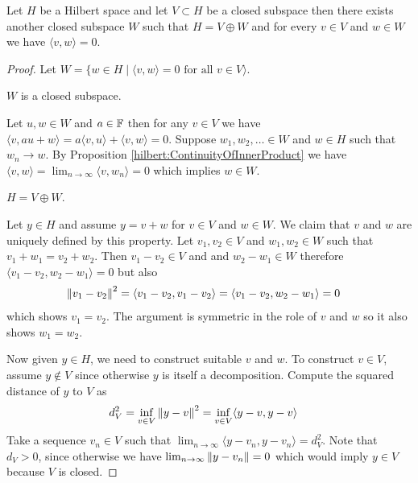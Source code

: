 \begin{prop}Let $H$ be a Hilbert space and let $V \subset H$ be a closed subspace then there exists another closed subspace $W$ such that $H = V \oplus W$ and for every $v \in V$ and $w \in W$ we have $\langle v, w \rangle = 0$.  
\end{prop}
\begin{proof}
Let $W = \lbrace w \in H \mid \langle v, w \rangle = 0 \text{ for all $v \in V$}  \rangle$.  

\begin{clm} $W$ is a closed subspace.  
\end{clm}
Let $u,w \in W$ and $a \in \mathbb{F}$ then for any $v \in V$ we have $\langle v, au + w \rangle = a \langle v, u \rangle + \langle v, w \rangle = 0$.  Suppose $w_1, w_2, \dotsc \in W$ and $w \in H$ such that $w_n \to w$.  By Proposition \ref{hilbert:ContinuityOfInnerProduct} we have $\langle v, w \rangle = \lim_{n \to \infty} \langle v, w_n \rangle = 0$ which implies $w \in W$.

\begin{clm} $H = V \oplus W$.
\end{clm}
Let $y \in H$ and assume $y = v + w$ for $v \in V$ and $w \in W$.   We
claim that $v$ and $w$ are uniquely defined by this property.  Let
$v_1, v_2 \in V$ and $w_1, w_2 \in W$ such that $v_1 + w_1 = v_2 +
w_2$.  Then $v_1 - v_2 \in V$ and and $w_2 - w_1 \in W$ therefore
$\langle v_1 - v_2, w_2 - w_1 \rangle = 0$ but also 
\begin{align*}
  \left \lVert v_1 - v_2 \right \rVert^2 &= \langle v_1 - v_2, v_1 - v_2 \rangle = \langle
                       v_1 - v_2, w_2 - w_1 \rangle = 0
\end{align*}
which shows $v_1 = v_2$.   The argument is symmetric in the role of
$v$ and $w$ so it also shows
$w_1 = w_2$.

Now given $y \in H$, we need to construct suitable $v$ and $w$.   To
construct $v \in V$, assume $y \notin V$ since otherwise $y$ is itself
a decomposition.   Compute the squared distance of $y$ to $V$ as
\begin{align*}
  d^2_V &= \inf_{v \in V} \left \lVert y -v \right \rVert^2 = \inf_{v \in V} \langle y -v, y - v \rangle
\end{align*}
Take a sequence $v_n \in V$ such that $\lim_{n \to \infty} \langle y
-v_n, y - v_n \rangle = d^2_V$.
Note that $d_V > 0$, since otherwise we have $\lim_{n \to \infty}
\left \lVert y - v_n \right \rVert = 0$ which would imply $y \in V$ because $V$ is closed.


\end{proof}

